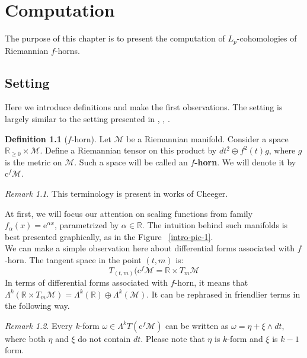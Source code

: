 \documentclass[licencjacka]{pracamgr}
\theoremstyle{definition}
\newtheorem{definition}{Definition}[section]
\theoremstyle{remark}
\newtheorem{remark}{Remark}[section]
\begin{document}
\chapter{Computation}

The purpose of this chapter is to present the computation of
$L_p$-cohomologies of Riemannian $f$-horns.

\section{Setting}
Here we introduce definitions and make the first observations. The setting
is largely similar to the setting presented in \cite{weber}, \cite{youssin},
\cite{cheeger}. \\

\begin{definition}[$f$-horn]
Let $\mathcal{M}$ be a Riemannian manifold. Consider a space $
\mathbb{R}_{\geq 0} \times \mathcal{M}$.  Define a Riemannian tensor
on this product by $dt^2 \oplus f^{2}(t)g $, where $g$ is the metric
on $\mathcal{M}$.  Such a space will be called an
\textbf{$f$-horn}. We will denote it by $\mathrm{c}^f \mathcal{M}$. \\
\end{definition}

\begin{remark}
This terminology is present in works of Cheeger.
\end{remark}

At first, we will focus our attention on scaling functions from family
$f_\alpha(x) = \mathrm{e}^{\alpha x}$, parametrized by $\alpha \in
\mathbb{R}$.  The intuition behind such manifolds is best presented
graphically, as in the Figure ~\ref{intro-pic-1}. \\


We can make a simple observation here about differential forms associated with
$f$-horn. The tangent space in the point $(t, m)$ is:
\[
    T_{(t, m)} (\mathrm{c}^f \mathcal{M} = \mathbb{R} \times T_m \mathcal{M}
\]
In terms of differential forms associated with $f$-horn, it means that
$\Lambda^k(\mathbb{R} \times T_m \mathcal{M}) = 
\Lambda^k(\mathbb{R})  \oplus \Lambda^k(\mathcal{M}) $.
It can be rephrased in friendlier terms in the following way.

\begin{remark}
Every $k$-form $\omega \in \Lambda^k T(\mathrm{c}^f \mathcal{M})$ can
be written as $\omega = \eta + \xi \wedge dt$, where both $\eta$ and
$\xi$ do not contain $dt$.  Please note that $\eta$ is $k$-form and
$\xi$ is $k-1$ form.
\end{remark}
\end{document}

